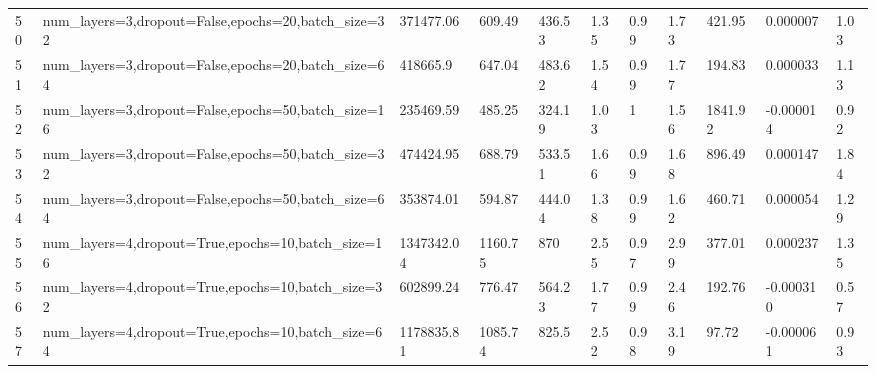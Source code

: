 \begin{longtable}{C{0.8cm} L{2cm} C{1.15cm} C{1.15cm} C{1.15cm} C{1.15cm} C{0.85cm} C{1.25cm} C{1.2cm} C{1.5cm} C{1.0cm}}
50 & num\_layers=3,\newline dropout=False,\newline epochs=20,\newline batch\_size=32 & 371477.06 & 609.49 & 436.53 & 1.35 & 0.99 & 1.73 & 421.95 & 0.000007 & 1.03 \\
51 & num\_layers=3,\newline dropout=False,\newline epochs=20,\newline batch\_size=64 & 418665.9 & 647.04 & 483.62 & 1.54 & 0.99 & 1.77 & 194.83 & 0.000033 & 1.13 \\
52 & num\_layers=3,\newline dropout=False,\newline epochs=50,\newline batch\_size=16 & 235469.59 & 485.25 & 324.19 & 1.03 & 1 & 1.56 & 1841.92 & -0.000014 & 0.92 \\
53 & num\_layers=3,\newline dropout=False,\newline epochs=50,\newline batch\_size=32 & 474424.95 & 688.79 & 533.51 & 1.66 & 0.99 & 1.68 & 896.49 & 0.000147 & 1.84 \\
54 & num\_layers=3,\newline dropout=False,\newline epochs=50,\newline batch\_size=64 & 353874.01 & 594.87 & 444.04 & 1.38 & 0.99 & 1.62 & 460.71 & 0.000054 & 1.29 \\
55 & num\_layers=4,\newline dropout=True,\newline epochs=10,\newline batch\_size=16 & 1347342.04 & 1160.75 & 870 & 2.55 & 0.97 & 2.99 & 377.01 & 0.000237 & 1.35 \\
56 & num\_layers=4,\newline dropout=True,\newline epochs=10,\newline batch\_size=32 & 602899.24 & 776.47 & 564.23 & 1.77 & 0.99 & 2.46 & 192.76 & -0.000310 & 0.57 \\
57 & num\_layers=4,\newline dropout=True,\newline epochs=10,\newline batch\_size=64 & 1178835.81 & 1085.74 & 825.5 & 2.52 & 0.98 & 3.19 & 97.72 & -0.000061 & 0.93 \\

\end{longtable}
